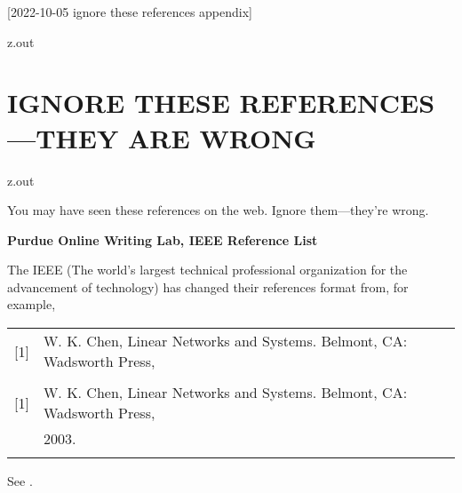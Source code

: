 [2022-10-05 ignore these references appendix]

\begin{VerbatimOut}{z.out}
\chapter{IGNORE THESE REFERENCES---THEY ARE WRONG}
\end{VerbatimOut}

\MyIO


\begin{VerbatimOut}{z.out}

You may have seen these references on the web.
Ignore them---they're wrong.

\noindent
\textbf{Purdue Online Writing Lab, IEEE Reference List}
\cite{owl}

The IEEE
(The world's largest technical professional organization
for the advancement
of technology)
has changed their references format from,
for example,

\noindent
\begin{tabular}{@{}ll@{}}
\noalign{\vspace*{6pt}}
  [1]& W. K. Chen, Linear Networks and Systems. Belmont, CA: Wadsworth Press,\\
  \multispan{2}{2003.\hfil}\\
\noalign{\vspace*{6pt}}
\noalign{\noindent to}
\noalign{\vspace*{6pt}}
  [1]& W. K. Chen, Linear Networks and Systems. Belmont, CA: Wadsworth Press,\\
  & 2003.\hfil\\
\noalign{\vspace*{6pt}}
\end{tabular}
See
\cite[page~2]{ieeedataport}.
\end{VerbatimOut}

\MyIO


% 

